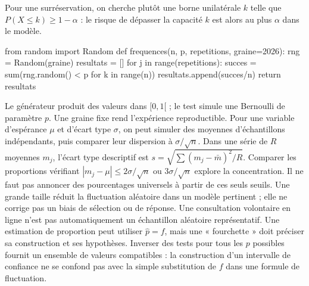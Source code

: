 Pour une surréservation, on cherche plutôt une borne unilatérale $k$ telle que $P(X\leq k)\geq1-\alpha$ : le risque de dépasser la capacité $k$ est alors au plus $\alpha$ dans le modèle.
\begin{python}
from random import Random
def frequences(n, p, repetitions, graine=2026):
    rng = Random(graine)
    resultats = []
    for j in range(repetitions):
        succes = sum(rng.random() < p for k in range(n))
        resultats.append(succes/n)
    return resultats
\end{python}
Le générateur produit des valeurs dans $[0,1[$ ; le test  simule une Bernoulli de paramètre $p$. Une graine fixe rend l'expérience reproductible.
Pour une variable d'espérance $\mu$ et d'écart type $\sigma$, on peut simuler des moyennes d'échantillons indépendants, puis comparer leur dispersion à $\sigma/\sqrt n$.
Dans une série de $R$ moyennes $m_j$, l'écart type descriptif est $s=\sqrt{\sum(m_j-\bar m)^2/R}$.
Comparer les proportions vérifiant $|m_j-\mu|\leq2\sigma/\sqrt n$ ou $3\sigma/\sqrt n$ explore la concentration. Il ne faut pas annoncer des pourcentages universels à partir de ces seuls seuils.
Une grande taille réduit la fluctuation aléatoire dans un modèle pertinent ; elle ne corrige pas un biais de sélection ou de réponse.
Une consultation volontaire en ligne n'est pas automatiquement un échantillon aléatoire représentatif.
Une estimation de proportion peut utiliser $\hat p=f$, mais une « fourchette » doit préciser sa construction et ses hypothèses.
Inverser des tests pour tous les $p$ possibles fournit un ensemble de valeurs compatibles : la construction d'un intervalle de confiance ne se confond pas avec la simple substitution de $f$ dans une formule de fluctuation.

